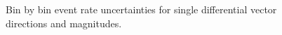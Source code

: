 \documentclass{article}
\begin{document}
\begin{figure}
    \caption{Bin by bin event rate uncertainties for single differential vector directions and magnitudes.}
    \label{fig:bin-uncertainties-rates-vector}
\end{figure}
\end{document}
